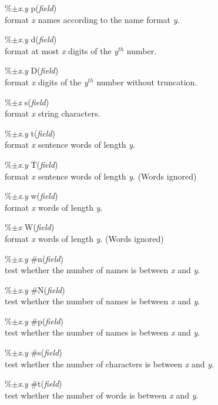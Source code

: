 \documentclass[a4paper]{article}
\newenvironment{FlatList}{\begin{list}{}{%
      \topsep=0pt\itemsep=0pt\parsep=0pt\let\makelabel=\flatlistlabel}}{\end{list}}%
\newcommand\flatlistlabel[1]{\descriptionlabel{\sf #1}}
\begin{document}
\begin{multicols}{4}
\begin{FlatList}
  \item [\%$\pm ${\it x}.{\it y}\/ p({\it field}\/)]\ \\
    format {\it x}\/ names according to the name format {\it y}.
  \item [\%$\pm ${\it x}.{\it y}\/ d({\it field}\/)]\ \\
    format at most {\it x}\/ digits of the {\it y}$^{th}$ number.
  \item [\%$\pm ${\it x}.{\it y}\/ D({\it field}\/)]\ \\
    format {\it x}\/ digits of the {\it y}$^{th}$ number without truncation.
  \item [\%$\pm ${\it x}\/ s({\it field}\/)]\ \\
    format {\it x}\/ string characters.
  \item [\%$\pm ${\it x}.{\it y}\/ t({\it field}\/)]\ \\
    format {\it x}\/ sentence words of length {\it y}.
  \item [\%$\pm ${\it x}.{\it y}\/ T({\it field}\/)]\ \\
    format {\it x}\/ sentence words  of length {\it y}. (Words ignored)
  \item [\%$\pm ${\it x}.{\it y}\/ w({\it field}\/)]\ \\
    format {\it x}\/ words of length {\it y}.
  \item [\%$\pm ${\it x}\/ W({\it field}\/)]\ \\
    format {\it x}\/ words of length {\it y}. (Words ignored)
  \item [\%$\pm ${\it x}.{\it y}\/ \#n({\it field}\/)]\ \\
    test whether the  number of names is between {\it x}\/ and {\it y}.
  \item [\%$\pm ${\it x}.{\it y}\/ \#N({\it field}\/)]\ \\
    test whether the  number of names is between {\it x}\/ and {\it y}.
  \item [\%$\pm ${\it x}.{\it y}\/ \#p({\it field}\/)]\ \\
    test whether the  number of names is between {\it x}\/ and {\it y}.
  \item [\%$\pm ${\it x}.{\it y}\/ \#s({\it field}\/)]\ \\
    test whether the  number of characters is between {\it x}\/ and {\it y}.
  \item [\%$\pm ${\it x}.{\it y}\/ \#t({\it field}\/)]\ \\
    test whether the  number of words is between {\it x}\/ and {\it y}.

\end{FlatList}
\end{multicols}
\end{document}

